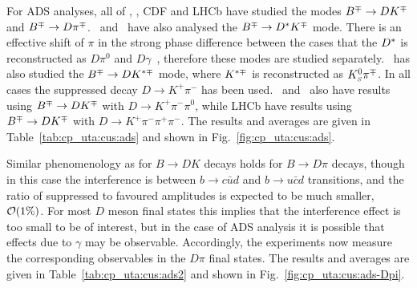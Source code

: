For ADS analyses, all of \babar, \belle, CDF and LHCb have studied the modes 
$B^\mp \to DK^\mp$ and $B^\mp \to D\pi^\mp$. 
\babar\ and \belle\ have also analysed the $B^\mp \to D^*K^\mp$ mode.
There is an effective shift of $\pi$ in the strong phase difference between
the cases that the $D^*$ is reconstructed as $D\pi^0$ and
$D\gamma$~\cite{Bondar:2004bi}, therefore these modes are studied separately.
\babar\ has also studied the $B^\mp \to DK^{*\mp}$ mode, 
where $K^{*\mp}$ is reconstructed as $K^0_{\scriptscriptstyle S}\pi^\mp$.
In all cases the suppressed decay $D \to K^+\pi^-$ has been used.
\babar\ and \belle\ also have results using $B^\mp \to DK^\mp$ with $D \to K^+\pi^-\pi^0$,
while LHCb have results using $B^\mp \to DK^\mp$ with $D \to K^+\pi^-\pi^+\pi^-$.
The results and averages are given in Table~\ref{tab:cp_uta:cus:ads}
and shown in Fig.~\ref{fig:cp_uta:cus:ads}.

Similar phenomenology as for $B \to DK$ decays holds for $B \to D\pi$ decays, though in this case the interference is between $b \to c\bar{u}d$ and $b \to u\bar{c}d$ transitions, and the ratio of suppressed to favoured amplitudes is expected to be much smaller, ${\cal O}(1\%)$.
For most $D$ meson final states this implies that the interference effect is too small to be of interest, but in the case of ADS analysis it is possible that effects due to $\gamma$ may be observable.
Accordingly, the experiments now measure the corresponding observables in the $D\pi$ final states.
The results and averages are given in Table~\ref{tab:cp_uta:cus:ads2}
and shown in Fig.~\ref{fig:cp_uta:cus:ads-Dpi}.



